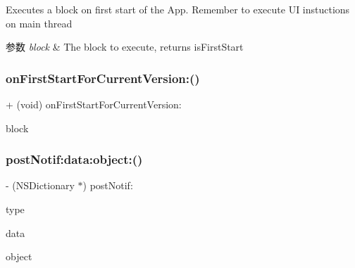Executes a block on first start of the App. Remember to execute UI instuctions on main thread


\begin{DoxyParams}{参数}
{\em block} & The block to execute, returns is\+First\+Start \\
\hline
\end{DoxyParams}
\mbox{\label{interface_m_a_r_global_manager_a0fa3b3aaa9b424536891ca366c9fc2a9}} 
\subsubsection{\texorpdfstring{on\+First\+Start\+For\+Current\+Version\+:()}{onFirstStartForCurrentVersion:()}\hspace{0.1cm}{\footnotesize\ttfamily [3/3]}}
{\footnotesize\ttfamily + (void) on\+First\+Start\+For\+Current\+Version\+: \begin{DoxyParamCaption}\item[{(void($^\wedge$)(B\+O\+OL \hyperlink{interface_m_a_r_global_manager_ab111e5c33b73bd47237c0006b532655b}{is\+First\+Start\+For\+Current\+Version}))}]{block }\end{DoxyParamCaption}}

\mbox{\label{interface_m_a_r_global_manager_a89718ff05d66b235e22d2bb2513320a4}} 
\subsubsection{\texorpdfstring{post\+Notif\+:data\+:object\+:()}{postNotif:data:object:()}}
{\footnotesize\ttfamily -\/ (N\+S\+Dictionary $\ast$) post\+Notif\+: \begin{DoxyParamCaption}\item[{(N\+S\+Integer)}]{type }\item[{data:(id)}]{data }\item[{object:(id)}]{object }\end{DoxyParamCaption}}


